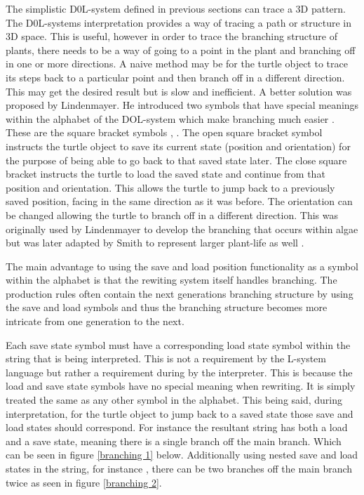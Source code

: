 The simplistic D0L-system defined in previous sections can trace a 3D pattern. The D0L-systems interpretation provides a way of tracing a path or structure in 3D space. This is useful, however in order to trace the branching structure of plants, there needs to be a way of going to a point in the plant and branching off in one or more directions. A naive method may be for the turtle object to trace its steps back to a particular point and then branch off in a different direction. This may get the desired result but is slow and inefficient. A better solution was proposed by Lindenmayer. He introduced two symbols that have special meanings within the alphabet of the DOL-system which make branching much easier \cite{lindenmayer1968mathematical}. These are the square bracket symbols \say{[}, \say{]}. The open square bracket \say{[} symbol instructs the turtle object to save its current state (position and orientation) for the purpose of being able to go back to that saved state later. The close square bracket \say{]} instructs the turtle to load the saved state and continue from that position and orientation. This allows the turtle to jump back to a previously saved position, facing in the same direction as it was before. The orientation can be changed allowing the turtle to branch off in a different direction. This was originally used by Lindenmayer to develop the branching that occurs within algae but was later adapted by Smith to represent larger plant-life as well \cite{smith1984plants}.
 
The main advantage to using the save and load position functionality as a symbol within the alphabet is that the rewiting system itself handles branching. The production rules often contain the next generations branching structure by using the save and load symbols and thus the branching structure becomes more intricate from one generation to the next.

Each save state symbol must have a corresponding load state symbol within the string that is being interpreted. This is not a requirement by the L-system language but rather a requirement during by the interpreter. This is because the load and save state symbols have no special meaning when rewriting. It is simply treated the same as any other symbol in the alphabet. This being said, during interpretation, for the turtle object to jump back to a saved state those save and load states should correspond. For instance the resultant string  has both a load and a save state, meaning there is a single branch off the main branch. Which can be seen in figure \ref{branching 1} below. Additionally using nested save and load states in the string, for instance , there can be two branches off the main branch twice as seen in figure \ref{branching 2}.

